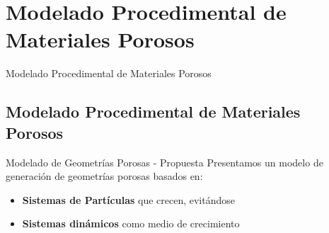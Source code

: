 \documentclass[spanish,unknownkeysallowed]{beamer}
\begin{document}
\section[Mod. de Materiales Porosos]{Modelado Procedimental de Materiales Porosos}

\begin{frame}
\begin{block}{}
\begin{center}
\vspace{1cm}
\huge{Modelado Procedimental de Materiales Porosos}
\vspace{1cm}
\end{center}
\end{block}
\end{frame}

\subsection{Modelado Procedimental de Materiales Porosos}
\begin{frame}{Modelado de Geometrías Porosas - Propuesta}
Presentamos un modelo de generación de geometrías porosas basados en:
\begin{itemize}
\item \textbf{Sistemas de Partículas} que crecen, evitándose
\item \textbf{Sistemas dinámicos} como medio de crecimiento
\end{itemize}
\end{frame}
\end{document}
